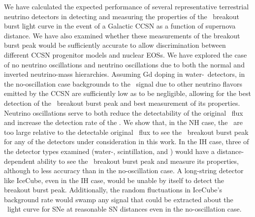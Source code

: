 We have calculated the expected performance of several representative
terrestrial neutrino detectors in detecting and measuring the
properties of the \nue\ breakout burst light curve in the event of a Galactic
CCSN as a function of supernova distance. We have also examined
whether these measurements of the breakout burst peak would be
sufficiently accurate to allow discrimination between different CCSN
progenitor models and nuclear EOSs.  We have explored the case
of no neutrino oscillations and neutrino oscillations due to
both the normal and inverted neutrino-mass hierarchies.  Assuming
Gd doping in water-\cer\ detectors, in the no-oscillation case
 backgrounds to the \nue\ signal 
due to other neutrino flavors emitted by the CCSN
are sufficiently low as to be negligible, allowing for the best
detection of the \nue\ breakout burst peak and best measurement of its
properties. Neutrino oscillations serve to both reduce the
detectability of the original \nue\ flux and increase the
detection rate of the \background.  We show that, in the NH
case, the \backgrounds\ are too large relative to the detectable original
\nue\ flux to see the \nue\ breakout burst peak for any of the
detectors under consideration in this work.  In the IH case,
three of
the detector types examined (water-\cer, scintillation, and
) would have a distance-dependent ability to see the
\nue\ breakout burst peak and measure its properties, although to less
accuracy than in the no-oscillation case.  
A long-string detector like IceCube, even in the IH case, would be unable by itself to
    detect the breakout burst peak.  Additionally, the random fluctuations in
    IceCube's background rate would swamp any signal that could be extracted about the 
    \nue\ light curve for SNe at reasonable SN distances even in 
    the no-oscillation case.


